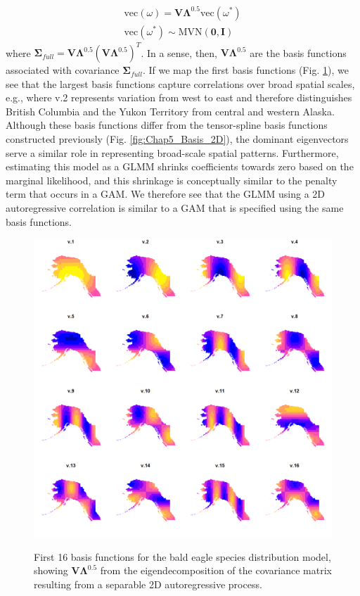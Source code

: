 \begin{gather*}
    \mathrm{vec}(\omega) = \mathbf{V \Lambda}^{0.5} \mathrm{vec}(\omega^*) \\
    \mathrm{vec}(\omega^*) \sim \mathrm{MVN}(\mathbf{0},\mathbf{I})
\end{gather*} 
where \( \mathbf{\Sigma}_{full} = \mathbf{V \Lambda}^{0.5} (\mathbf{V \Lambda}^{0.5})^T \).  In a sense, then, \( \mathbf{V \Lambda}^{0.5} \) are the basis functions associated with covariance \( \mathbf{\Sigma}_{full} \).  If we map the first basis functions (Fig. \ref{fig:Chap5_AR_basis_functions}), we see that the largest basis functions capture correlations over broad spatial scales, e.g., where v.2 represents variation from west to east and therefore distinguishes British Columbia and the Yukon Territory from central and western Alaska.  Although these basis functions differ from the tensor-spline basis functions constructed previously (Fig. \ref{fig:Chap5_Basis_2D}), the dominant eigenvectors serve a similar role in representing broad-scale spatial patterns.  Furthermore, estimating this model as a GLMM shrinks coefficients towards zero based on the marginal likelihood, and this shrinkage is conceptually similar to the penalty term that occurs in a GAM.  We therefore see that the GLMM using a 2D autoregressive correlation is similar to a GAM that is specified using the same basis functions.  

\begin{figure}[!ht]
    \caption[Example of basis functions for 2D autoregressive process]{First 16 basis functions for the bald eagle species distribution model, showing \( \mathbf{V \Lambda}^{0.5} \) from the eigendecomposition of the covariance matrix resulting from a separable 2D autoregressive process.}
    \centering
    \includegraphics[width=5.5in]{Chap_5/Mapped_AR_basis_functions.png}
    \label{fig:Chap5_AR_basis_functions}
\end{figure}


